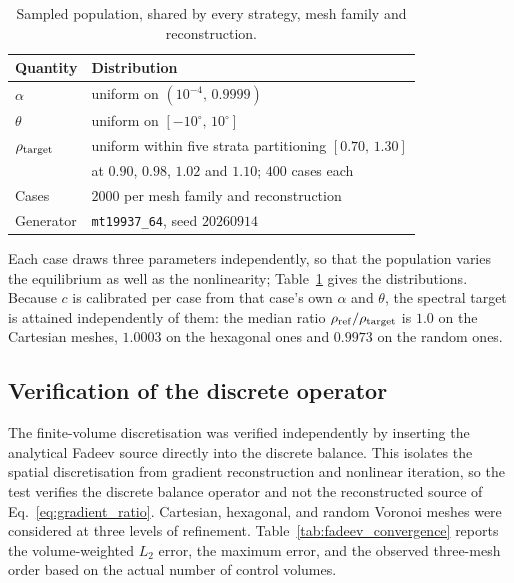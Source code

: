 \begin{table}[h]
\centering
\caption{Sampled population, shared by every strategy, mesh family and reconstruction.}
\label{tab:sampling_design}
\begin{tabular}{ll}
\toprule
Quantity & Distribution \\
\midrule
$\alpha$            & uniform on $(10^{-4},\,0.9999)$ \\
$\theta$            & uniform on $[-10^\circ,\,10^\circ]$ \\
$\rho_{\rm target}$ & uniform within five strata partitioning $[0.70,\,1.30]$ \\
                    & at $0.90$, $0.98$, $1.02$ and $1.10$; $400$ cases each \\
Cases               & $2000$ per mesh family and reconstruction \\
Generator           & \texttt{mt19937\_64}, seed $20260914$ \\
\bottomrule
\end{tabular}
\end{table}

Each case draws three parameters independently, so that the population varies the equilibrium as well as the nonlinearity; Table~\ref{tab:sampling_design} gives the distributions. Because $c$ is calibrated per case from that case's own $\alpha$ and $\theta$, the spectral target is attained independently of them: the median ratio $\rho_{\rm ref}/\rho_{\rm target}$ is $1.0$ on the Cartesian meshes, $1.0003$ on the hexagonal ones and $0.9973$ on the random ones.

\subsection{Verification of the discrete operator}
\label{subsec:fadeev_verification}

The finite-vol\-ume discretisation was verified independently by inserting the analytical Fadeev source directly into the discrete balance. This isolates the spatial discretisation from gradient reconstruction and nonlinear iteration, so the test verifies the discrete balance operator and not the reconstructed source of Eq.~\eqref{eq:gradient_ratio}. Cartesian, hexagonal, and random Voronoi meshes were considered at three levels of refinement. Table~\ref{tab:fadeev_convergence} reports the volume-weighted $L_2$ error, the maximum error, and the observed three-mesh order based on the actual number of control volumes.

